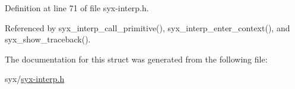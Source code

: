 Definition at line 71 of file syx-interp.h.

Referenced by syx\_\-interp\_\-call\_\-primitive(), syx\_\-interp\_\-enter\_\-context(), and syx\_\-show\_\-traceback().

The documentation for this struct was generated from the following file:\begin{CompactItemize}
\item 
syx/\hyperlink{syx-interp_8h}{syx-interp.h}\end{CompactItemize}
